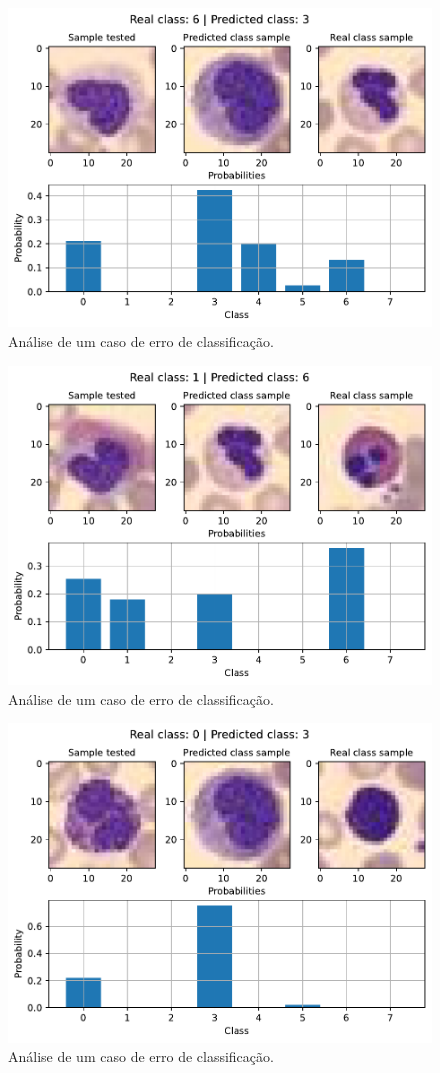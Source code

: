 \begin{figure}[H]
\centering
\includegraphics[width=0.75\linewidth]{../../plot/cnn_shallow/error_analyser_35}
\caption{Análise de um caso de erro de classificação.}
\label{fig:error_analyser_35}
\end{figure}

\begin{figure}[H]
\centering
\includegraphics[width=0.75\linewidth]{../../plot/cnn_shallow/error_analyser_1516}
\caption{Análise de um caso de erro de classificação.}
\label{fig:error_analyser_1516}
\end{figure}

\begin{figure}[H]
\centering
\includegraphics[width=0.75\linewidth]{../../plot/cnn_shallow/error_analyser_36}
\caption{Análise de um caso de erro de classificação.}
\label{fig:error_analyser_36_cnn}
\end{figure}

